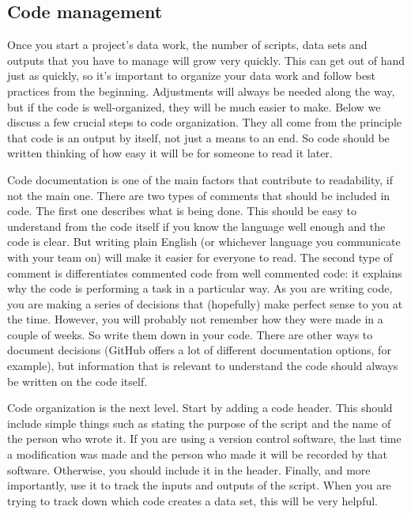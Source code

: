 \subsection{Code management}

Once you start a project's data work, 
the number of scripts, data sets and outputs that you have to manage will grow very quickly. 
This can get out of hand just as quickly, 
so it's important to organize your data work and follow best practices from the beginning. 
Adjustments will always be needed along the way, 
but if the code is well-organized, they will be much easier to make.
Below we discuss a few crucial steps to code organization.
They all come from the principle that code is an output by itself, 
not just a means to an end. 
So code should be written thinking of how easy it will be for someone to read it later.

Code documentation is one of the main factors that contribute to readability, 
if not the main one. 
There are two types of comments that should be included in code. 
The first one describes what is being done. 
This should be easy to understand from the code itself if you know the language well enough and the code is clear. 
But writing plain English (or whichever language you communicate with your team on) 
will make it easier for everyone to read. 
The second type of comment is differentiates commented code from well commented code:
it explains why the code is performing a task in a particular way. 
As you are writing code, you are making a series of decisions that 
(hopefully) make perfect sense to you at the time. 
However, you will probably not remember how they were made in a couple of weeks. 
So write them down in your code. 
There are other ways to document decisions 
(GitHub offers a lot of different documentation options, for example), 
but information that is relevant to understand the code should always be written on the code itself.

Code organization is the next level. 
Start by adding a code header. 
This should include simple things such as stating the purpose of the script and the name of the person who wrote it. 
If you are using a version control software, 
the last time a modification was made and the person who made it will be recorded by that software. 
Otherwise, you should include it in the header. 
Finally, and more importantly, use it to track the inputs and outputs of the script. 
When you are trying to track down which code creates a data set, this will be very helpful. 
 
